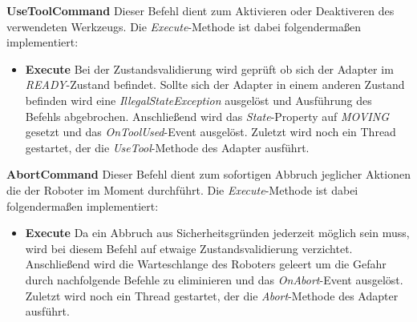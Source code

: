 \textbf{UseToolCommand}
\newline
Dieser Befehl dient zum Aktivieren oder Deaktiveren des verwendeten Werkzeugs. Die \textit{Execute}-Methode ist dabei folgendermaßen implementiert:
\begin{itemize}
\item \textbf{Execute}
\newline
Bei der Zustandsvalidierung wird geprüft ob sich der Adapter im \textit{READY}-Zustand befindet. Sollte sich der Adapter in einem anderen Zustand befinden wird eine \textit{IllegalStateException} ausgelöst und Ausführung des Befehls abgebrochen. Anschließend wird das \textit{State}-Property auf \textit{MOVING} gesetzt und das \textit{OnToolUsed}-Event ausgelöst. Zuletzt wird noch ein Thread gestartet, der die \textit{UseTool}-Methode des Adapter ausführt. 
\end{itemize}

\textbf{AbortCommand}
\newline
Dieser Befehl dient zum sofortigen Abbruch jeglicher Aktionen die der Roboter im Moment durchführt. Die \textit{Execute}-Methode ist dabei folgendermaßen implementiert:
\begin{itemize}
\item \textbf{Execute}
\newline
Da ein Abbruch aus Sicherheitsgründen jederzeit möglich sein muss, wird bei diesem Befehl auf etwaige Zustandsvalidierung verzichtet. Anschließend wird die Warteschlange des Roboters geleert um die Gefahr durch nachfolgende Befehle zu eliminieren und das \textit{OnAbort}-Event ausgelöst. Zuletzt wird noch ein Thread gestartet, der die \textit{Abort}-Methode des Adapter ausführt. 
\end{itemize}